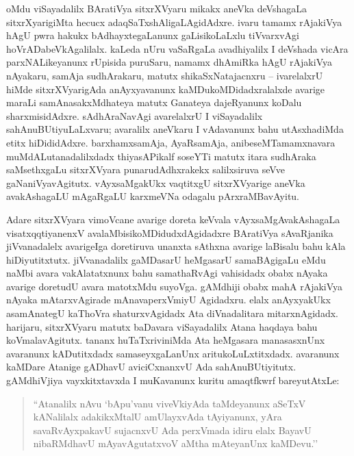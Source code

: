 oMdu viSayadalilx BAratiVya sitxrXVyaru mikakx aneVka deVshagaLa sitxrXyarigiMta hecucx adaqSaTxshAligaLAgidAdxre. ivaru tamamx rAjakiVya hAgU pwra hakukx bAdhayxtegaLanunx gaLisikoLaLxlu tiVvarxvAgi hoVrADabeVkAgalilalx. kaLeda nUru vaSaRgaLa avadhiyalilx I deVshada vicAra parxNALikeyanunx rUpisida puruSaru, namamx dhAmiRka hAgU rAjakiVya nAyakaru, samAja sudhArakaru, matutx shikaSxNatajacnxru -- ivarelalxrU hiMde sitxrXVyarigAda anAyxyavanunx kaMDukoMDidadxralalxde avarige maraLi samAnasakxMdhateya matutx Ganateya dajeRyanunx koDalu sharxmisidAdxre. sAdhAraNavAgi avarelalxrU I viSayadalilx sahAnuBUtiyuLaLxvaru; avaralilx aneVkaru I vAdavanunx bahu utAsxhadiMda etitx hiDididAdxre. barxhamxsamAja, AyaRsamAja, anibeseMTamamxnavara muMdALutanadalilxdadx thiyasAPikalf soseYTi matutx itara sudhAraka saMsethxgaLu sitxrXVyara punarudAdhxrakekx salilxsiruva seVve gaNaniVyavAgitutx. vAyxsaMgakUkx vaqtitxgU sitxrXVyarige aneVka avakAshagaLU mAgaRgaLU karxmeVNa odagalu pArxraMBavAyitu.

Adare sitxrXVyara vimoVcane avarige doreta keVvala vAyxsaMgAvakAshagaLa visatxqqti\-yanenxV avalaMbisikoMDidudxdAgidadxre BAratiVya sAvaRjanika jiVvanadalelx avarige\break Iga doretiruva unanxta sAthxna avarige laBisalu bahu kAla hiDiyutitxtutx. jiVvana\-dalilx gaMDasarU heMgasarU samaBAgigaLu eMdu naMbi avara vakAlatatxnunx bahu samathaR\-vAgi vahisidadx obabx nAyaka avarige doretudU avara matotxMdu \hbox{suyoVga}. gAMdhiji obabx mahA rAjakiVya nAyaka mAtarxvAgirade mAnavaperxVmiyU Agidadxru. elalx anAyxyakUkx asamAnategU kaThoVra shaturxvAgidadx Ata diVnadalitara mitarxnAgidadx. harijaru, sitxrXVyaru matutx baDavara viSayadalilx Atana haqdaya bahu koVmalavAgitutx. tananx huTaTxriviniMda Ata heMgasara manasasxnUnx avaranunx kADutitxdadx samaseyxgaLanUnx aritukoLuLxtitxdadx. avaranunx kaMDare Atanige gADhavU aviciCxnanxvU Ada sahAnuBUtiyitutx. gAMdhiVjiya vayxkitxtavxda I muKavanunx kuritu amaqtfkwrf bareyutAtxLe:

\begin{quote}
``Atanalilx nAvu `bApu'vanu viveVkiyAda taMdeyanunx aSeTxV kANalilalx adakikxMtalU amUlayxvAda tAyiyanunx, yAra savaR\-vAyxpakavU sujacnxvU Ada perxVmada idiru elalx BayavU nibaRMdhavU mAyavAgutatxvoV aMtha mAteyanUnx kaMDevu.''
\end{quote}

